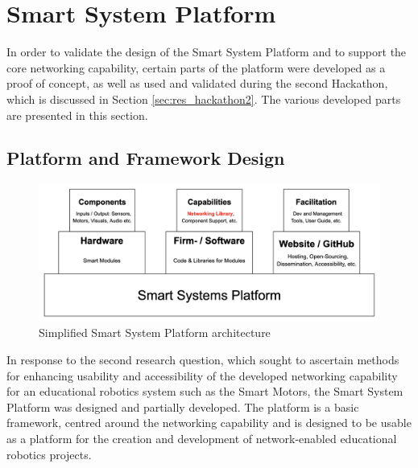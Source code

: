 \section{\label{sec:res_capabilities}Smart System Platform} %

In order to validate the design of the Smart System Platform and to support the core networking capability, certain parts of the platform were developed as a proof of concept, as well as used and validated during the second Hackathon, which is discussed in Section \ref{sec:res_hackathon2}. The various developed parts are presented in this section.

\subsection{\label{sec:res_design}Platform and Framework Design} %

\begin{figure}[H]
    \centering
    \includegraphics[width=\linewidth]{overleaf/images/SSP.png}
    \vspace{\ftspace}
    \caption{Simplified Smart System Platform architecture}
    \label{fig:ssp_architecture}
\end{figure}

In response to the second research question, which sought to ascertain methods for enhancing usability and accessibility of the developed networking capability for an educational robotics system such as the Smart Motors, the Smart System Platform was designed and partially developed. The platform is a basic framework, centred around the networking capability and is designed to be usable as a platform for the creation and development of network-enabled educational robotics projects. \\

